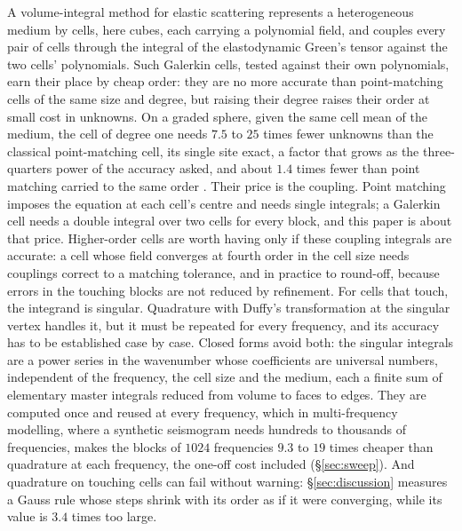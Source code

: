 \documentclass[11pt,a4paper]{article}
\begin{document}
A volume-integral method for elastic scattering represents a heterogeneous medium by cells, here cubes,
each carrying a polynomial field, and couples every pair of cells through the integral of the
elastodynamic Green's tensor against the two cells' polynomials. Such Galerkin cells, tested against their
own polynomials, earn their place by cheap order: they are no more accurate than point-matching cells of the
same size and degree, but raising their degree raises their order at small cost in unknowns. On a graded
sphere, given the same cell mean of the medium, the cell of degree one needs $7.5$ to $25$ times fewer
unknowns than the classical point-matching cell, its single site exact, a factor that grows as the
three-quarters power of the accuracy asked, and about $1.4$ times fewer than point matching carried to the
same order \citep{NestorError2026}. Their price is the coupling. Point matching imposes the equation at each cell's
centre and needs single integrals; a Galerkin cell needs a double integral over two cells for every block,
and this paper is about that price. Higher-order cells are worth having only
if these coupling integrals are accurate: a cell whose field converges at fourth order in the cell size
\citep{NestorError2026} needs couplings correct to a matching tolerance, and in practice to
round-off, because errors in the touching blocks are not reduced by refinement. For cells that touch, the
integrand is singular. Quadrature with Duffy's transformation \citep{Duffy1982} at the singular vertex
handles it, but it must be repeated for every frequency, and its accuracy has to be established case by
case. Closed forms avoid both: the singular integrals are a power series in the wavenumber whose
coefficients are universal numbers, independent of the frequency, the cell size and the medium, each a
finite sum of elementary master integrals reduced from volume to faces to edges. They are computed once and
reused at every frequency, which in multi-frequency modelling, where a synthetic seismogram needs hundreds to
thousands of frequencies, makes the blocks of $1024$ frequencies $9.3$ to $19$ times cheaper than quadrature
at each frequency, the one-off cost included (\S\ref{sec:sweep}). And quadrature on touching cells can fail
without warning: \S\ref{sec:discussion} measures a Gauss rule whose steps shrink with its order as if it
were converging, while its value is $3.4$ times too large.
\end{document}
